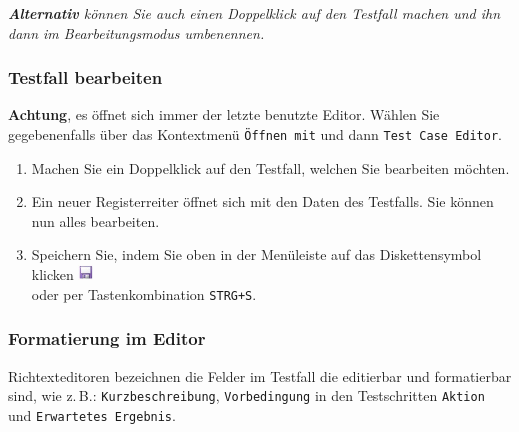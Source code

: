 \documentclass[11pt,a4paper,titlepage]{article}
\begin{document}
\textit{\textbf{Alternativ} können Sie auch einen Doppelklick auf den Testfall machen und ihn dann im Bearbeitungsmodus umbenennen.}

\subsubsection{Testfall bearbeiten}
\textbf{Achtung}, es öffnet sich immer der letzte benutzte Editor. Wählen Sie gegebenenfalls über das Kontextmenü \texttt{Öffnen mit} und dann \texttt{Test Case Editor}.
\begin{enumerate}
\item Machen Sie ein Doppelklick auf den Testfall, welchen Sie bearbeiten möchten.
\item Ein neuer Registerreiter öffnet sich mit den Daten des Testfalls. Sie können nun alles bearbeiten.
\item Speichern Sie, indem Sie oben in der Menüleiste auf das
Diskettensymbol klicken
\includegraphics[width= 15px]{BilderHandbuch/Testfall/Disk.png}
\\ oder per Tastenkombination \texttt{STRG+S}.
\end{enumerate}

\subsubsection{Formatierung im Editor}
Richtexteditoren bezeichnen die Felder im Testfall die editierbar und
formatierbar sind, wie z.\,B.: \texttt{Kurzbeschreibung}, \texttt{Vorbedingung} in den Testschritten \texttt{Aktion} und \texttt{Erwartetes Ergebnis}.
\end{document}
